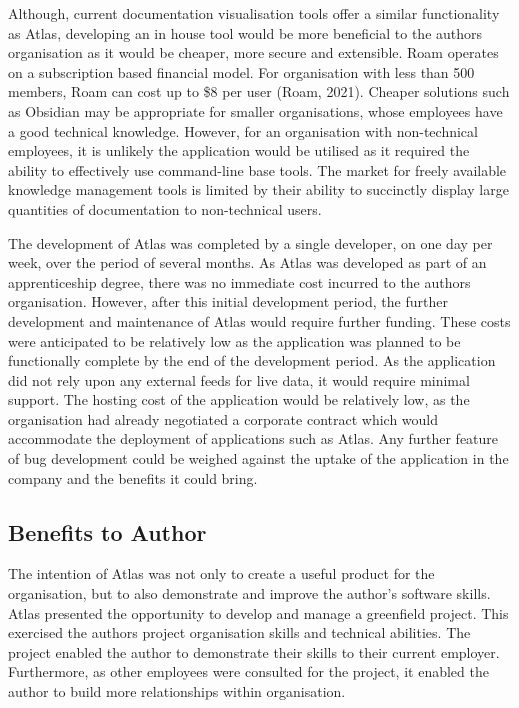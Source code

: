 \documentclass{article}
\begin{document}
Although, current documentation visualisation tools offer a similar functionality as Atlas, developing an in house tool would be more beneficial to the authors organisation as it would be cheaper, more secure and extensible. Roam operates on a subscription based financial model. For organisation with less than 500 members, Roam can cost up to \$8 per user (Roam, 2021). Cheaper solutions such as Obsidian may be appropriate for smaller organisations, whose employees have a good technical knowledge. However, for an organisation with non-technical employees, it is unlikely the application would be utilised as it required the ability to effectively use command-line base tools. The market for freely available knowledge management tools is limited by their ability to succinctly display large quantities of documentation to non-technical users.

The development of Atlas was completed by a single developer, on one day per week, over the period of several months. As Atlas was developed as part of an apprenticeship degree, there was no immediate cost incurred to the authors organisation. However, after this initial development period, the further development and maintenance of Atlas would require further funding. These costs were anticipated to be relatively low as the application was planned to be functionally complete by the end of the development period. As the application did not rely upon any external feeds for live data, it would require minimal support. The hosting cost of the application would be relatively low, as the organisation had already negotiated a corporate contract which would accommodate the deployment of applications such as Atlas. Any further feature of bug development could be weighed against the uptake of the application in the company and the benefits it could bring. 

\subsection{Benefits to Author}

The intention of Atlas was not only to create a useful product for the organisation, but to also demonstrate and improve the author's software skills. Atlas presented the opportunity to develop and manage a greenfield project. This exercised the authors project organisation skills and technical abilities. The project enabled the author to demonstrate their skills to their current employer. Furthermore, as other employees were consulted for the project, it enabled the author to build more relationships within organisation.
\end{document}
